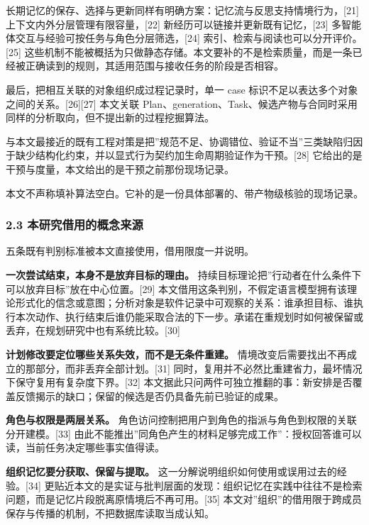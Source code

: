 \documentclass[
]{article}
\begin{document}
长期记忆的保存、选择与更新同样有明确方案：记忆流与反思支持情境行为，{[}21{]}
上下文内外分层管理有限容量，{[}22{]}
新经历可以链接并更新既有记忆，{[}23{]}
多智能体交互与经验可按任务与角色分层筛选，{[}24{]}
索引、检索与阅读也可以分开评价。{[}25{]}
这些机制不能被概括为只做静态存储。本文要补的不是检索质量，而是一条已经被正确读到的规则，其适用范围与接收任务的阶段是否相容。

最后，把相互关联的对象组织成过程记录时，单一 case
标识不足以表达多个对象之间的关系。{[}26{]}{[}27{]} 本文关联
Plan、generation、Task、候选产物与合同时采用同样的分析取向，但不提出新的过程挖掘算法。

与本文最接近的既有工程对策是把''规范不足、协调错位、验证不当''三类缺陷归因于缺少结构化约束，并以显式行为契约加生命周期验证作为干预。{[}28{]}
它给出的是干预与度量，本文给出的是干预之前那份现场记录。

本文不声称填补算法空白。它补的是一份具体部署的、带产物级核验的现场记录。

\subsubsection{2.3
本研究借用的概念来源}\label{ux672cux7814ux7a76ux501fux7528ux7684ux6982ux5ff5ux6765ux6e90}

五条既有判别标准被本文直接使用，借用限度一并说明。

\textbf{一次尝试结束，本身不是放弃目标的理由。}
持续目标理论把''行动者在什么条件下可以放弃目标''放在中心位置。{[}29{]}
本文借用这条判别，不假定语言模型拥有该理论形式化的信念或意图；分析对象是软件记录中可观察的关系：谁承担目标、谁执行本次动作、执行结束后谁仍能采取合法的下一步。承诺在重规划时如何被保留或丢弃，在规划研究中也有系统比较。{[}30{]}

\textbf{计划修改要定位哪些关系失效，而不是无条件重建。}
情境改变后需要找出不再成立的那部分，而非丢弃全部计划。{[}31{]}
同时，复用并不必然比重建省力，最坏情况下保守复用有复杂度下界。{[}32{]}
本文据此只问两件可独立推翻的事：新安排是否覆盖反馈揭示的缺口；保留的候选是否仍具备先前已验证的成果。

\textbf{角色与权限是两层关系。}
角色访问控制把用户到角色的指派与角色到权限的关联分开建模。{[}33{]}
由此不能推出''同角色产生的材料足够完成工作''：授权回答谁可以读，当前任务决定哪些事实值得读。

\textbf{组织记忆要分获取、保留与提取。}
这一分解说明组织如何使用或误用过去的经验。{[}34{]}
更贴近本文的是实证与批判层面的发现：组织记忆在实践中往往不是检索问题，而是记忆片段脱离原情境后不再可用。{[}35{]}
本文对''组织''的借用限于跨成员保存与传播的机制，不把数据库读取当成认知。
\end{document}
